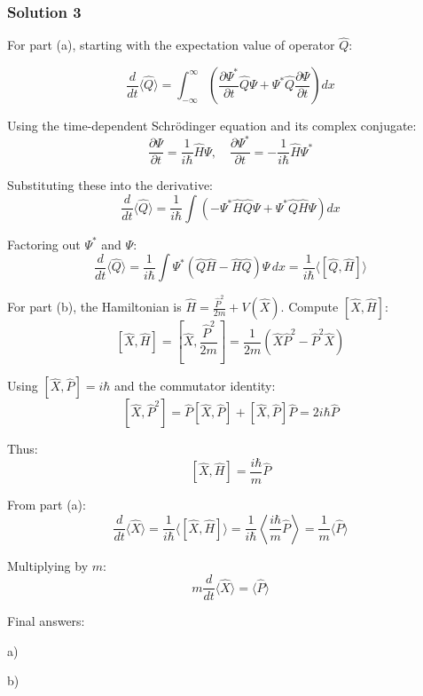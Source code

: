 \documentclass{article}
\begin{document}
\subsubsection{Solution 3}
For part (a), starting with the expectation value of operator $\hat{Q}$:

\[
\frac{d}{dt} \langle \hat{Q} \rangle = \int_{-\infty}^\infty \left( \frac{\partial \Psi^*}{\partial t} \hat{Q} \Psi + \Psi^* \hat{Q} \frac{\partial \Psi}{\partial t} \right) dx
\]

Using the time-dependent Schrödinger equation and its complex conjugate:
\[
\frac{\partial \Psi}{\partial t} = \frac{1}{i\hbar} \hat{H} \Psi, \quad \frac{\partial \Psi^*}{\partial t} = -\frac{1}{i\hbar} \hat{H} \Psi^*
\]

Substituting these into the derivative:
\[
\frac{d}{dt} \langle \hat{Q} \rangle = \frac{1}{i\hbar} \int \left( -\Psi^* \hat{H} \hat{Q} \Psi + \Psi^* \hat{Q} \hat{H} \Psi \right) dx
\]

Factoring out $\Psi^*$ and $\Psi$:
\[
\frac{d}{dt} \langle \hat{Q} \rangle = \frac{1}{i\hbar} \int \Psi^* \left( \hat{Q} \hat{H} - \hat{H} \hat{Q} \right) \Psi \, dx = \frac{1}{i\hbar} \langle [\hat{Q}, \hat{H}] \rangle
\]

For part (b), the Hamiltonian is $\hat{H} = \frac{\hat{P}^2}{2m} + V(\hat{X})$. Compute $[\hat{X}, \hat{H}]$:
\[
[\hat{X}, \hat{H}] = \left[ \hat{X}, \frac{\hat{P}^2}{2m} \right] = \frac{1}{2m} \left( \hat{X} \hat{P}^2 - \hat{P}^2 \hat{X} \right)
\]

Using $[\hat{X}, \hat{P}] = i\hbar$ and the commutator identity:
\[
[\hat{X}, \hat{P}^2] = \hat{P} [\hat{X}, \hat{P}] + [\hat{X}, \hat{P}] \hat{P} = 2i\hbar \hat{P}
\]

Thus:
\[
[\hat{X}, \hat{H}] = \frac{i\hbar}{m} \hat{P}
\]

From part (a):
\[
\frac{d}{dt} \langle \hat{X} \rangle = \frac{1}{i\hbar} \langle [\hat{X}, \hat{H}] \rangle = \frac{1}{i\hbar} \left\langle \frac{i\hbar}{m} \hat{P} \right\rangle = \frac{1}{m} \langle \hat{P} \rangle
\]

Multiplying by $m$:
\[
m \frac{d}{dt} \langle \hat{X} \rangle = \langle \hat{P} \rangle
\]

Final answers:

a) 

b) 
\end{document}
